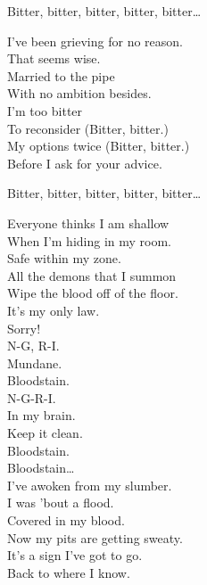 
Bitter, bitter, bitter, bitter, bitter… \\


I've been grieving for no reason. \\
That seems wise. \\
Married to the pipe \\
With no ambition besides. \\

I'm too bitter \\
To reconsider (Bitter, bitter.) \\
My options twice (Bitter, bitter.) \\
Before I ask for your advice. \\


Bitter, bitter, bitter, bitter, bitter… \\




Everyone thinks I am shallow \\
When I'm hiding in my room. \\
Safe within my zone. \\
All the demons that I summon \\
Wipe the blood off of the floor. \\
It's my only law. \\

Sorry! \\

N-G, R-I. \\
Mundane. \\
Bloodstain. \\
N-G-R-I. \\
In my brain. \\
Keep it clean. \\
Bloodstain. \\

Bloodstain… \\

I've awoken from my slumber. \\
I was  'bout a flood. \\
Covered in my blood. \\
Now my pits are getting sweaty. \\
It's a sign I've got to go. \\
Back to where I know. \\


